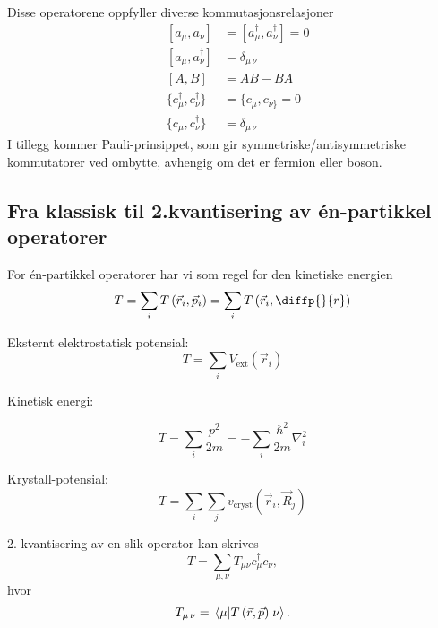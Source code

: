 Disse operatorene oppfyller diverse kommutasjonsrelasjoner
\begin{align}
&[a_\mu, a_{\nu}] & = [a_\mu^\dagger, a_{\nu}^\dagger] = 0 \\
&[a_\mu, a_{\nu}^\dagger] & = \delta_{\mu\,\nu} \\
&[A,B] &= AB-BA \\
&\{c_\mu^\dagger, c_{\nu}^\dagger\} & = \{c_\mu, c_{\nu\}} = 0 \\
&\{c_\mu, c_{\nu}^\dagger\} & = \delta_{\mu\,\nu} 
\end{align}
I tillegg kommer Pauli-prinsippet, som gir symmetriske/antisymmetriske kommutatorer ved ombytte, avhengig om det er fermion eller boson. 

\subsection{Fra klassisk til 2.kvantisering av én-partikkel operatorer}

For én-partikkel operatorer har vi som regel for den kinetiske energien
\begin{equation}
T = \sum_i T\left(\vec{r}_i, \vec{p}_i\right) = \sum_i T\left(\vec{r}_i, \diffp{}{r}\right)
\end{equation}
\begin{theorem}
Eksternt elektrostatisk potensial:
\begin{equation}
T = \sum_i V_{\text{ext}}\left(\vec{r}_i\right)
\end{equation}
\end{theorem}
\begin{theorem}

Kinetisk energi:

\begin{equation}
T = \sum_i \frac{p^2}{2m} = -\sum_i \frac{\hbar^2}{2m}\nabla_i^2
\end{equation}
\end{theorem}

\begin{theorem}
Krystall-potensial:
\begin{equation}
T = \sum_i \sum_j v_{\text{cryst}} \left( \vec{r}_i, \vec{R}_j \right)
\end{equation}
\end{theorem}

2. kvantisering av en slik operator kan skrives
\begin{equation}
T = \sum_{\mu, \nu} T_{\mu\nu}c_\mu^\dagger c_{\nu},
\end{equation}
hvor 
\begin{equation}
T_{\mu\,\nu} = \mel{\mu}{T\left(\vec{r}, \vec{p}\right)}{\nu}.	
\end{equation}

